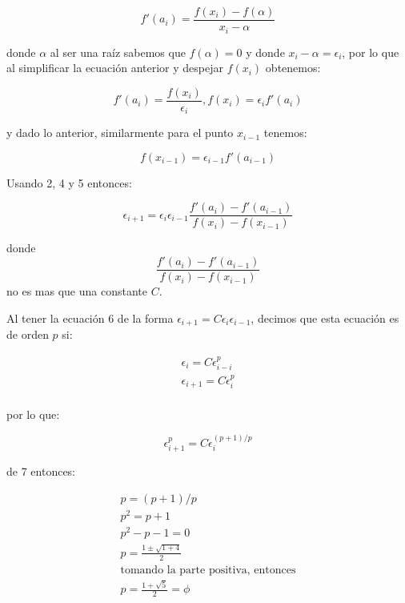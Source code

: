 \documentclass{article} %
\begin{document}
\begin{equation}
    f'(a_i) = \frac{f(x_i)-f(\alpha)}{x_i-\alpha}
\end{equation}

donde $\alpha$ al ser una raíz sabemos que $f(\alpha)=0$ y donde $x_i-\alpha=\epsilon_i$, por lo que al simplificar la ecuación anterior y despejar $f(x_i)$ obtenemos:

\begin{equation}
    f'(a_i) = \frac{f(x_i)}{\epsilon_i}, f(x_i) = \epsilon_i f'(a_i)
\end{equation}

y dado lo anterior, similarmente para el punto $x_{i-1}$ tenemos:

\begin{equation}
    f(x_{i-1}) = \epsilon_{i-1} f'(a_{i-1})
\end{equation}

Usando 2, 4 y 5 entonces:

\begin{equation}
    \epsilon_{i+1} = \epsilon_{i}\epsilon_{i-1}\frac{f'(a_{i}) - f'(a_{i-1})}{f(x_{i}) - f(x_{i-1})}
\end{equation}

donde 
\begin{equation*}
    \frac{f'(a_{i}) - f'(a_{i-1})}{f(x_{i}) - f(x_{i-1})}
\end{equation*}
no es mas que una constante $C$.

Al tener la ecuación 6 de la forma $\epsilon_{i+1} = C\epsilon_{i}\epsilon_{i-1}$, decimos que esta ecuación es de orden $p$ si:

\begin{gather*}
    \epsilon_i = C \epsilon_{i-i}^p\\
    \epsilon_{i+1} = C \epsilon_{i}^p\\
\end{gather*}

por lo que:

\begin{equation}
    \epsilon_{i+1}^p = C \epsilon_{i}^{(p+1)/{p}}
\end{equation}

de 7 entonces:

\begin{gather*}
    p = (p+1)/p\\
    p^2 = p + 1\\
    p^2 -p -1 = 0\\
    p = \frac{1 \pm \sqrt{1 + 4}}{2}\\
    \text{tomando la parte positiva, entonces}\\
    p = \frac{1 + \sqrt{5}}{2} = \phi
\end{gather*}
\end{document}
